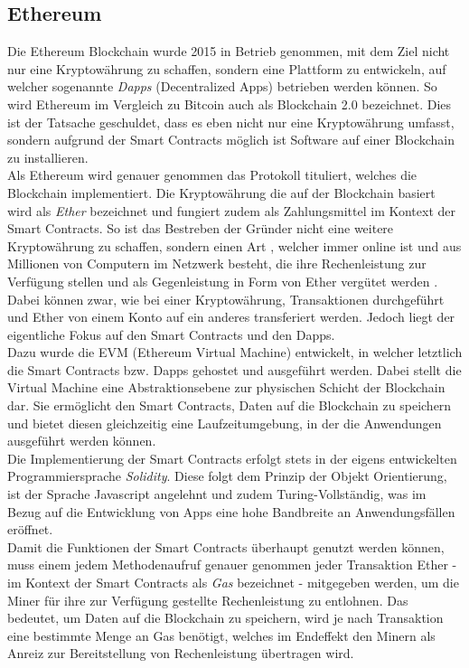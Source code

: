 \subsection{Ethereum}
Die Ethereum Blockchain wurde 2015 in Betrieb genommen, mit dem Ziel nicht nur eine Kryptowährung zu schaffen, sondern eine Plattform zu entwickeln, auf welcher sogenannte \textit{Dapps} (Decentralized Apps) betrieben werden können.
So wird Ethereum im Vergleich zu Bitcoin auch als Blockchain 2.0 bezeichnet. Dies ist der Tatsache geschuldet, dass es eben nicht nur eine Kryptowährung umfasst, sondern aufgrund der Smart Contracts möglich ist Software auf einer Blockchain zu installieren. \\
Als Ethereum wird genauer genommen das Protokoll tituliert, welches die Blockchain implementiert. Die Kryptowährung die auf der Blockchain basiert wird als \textit{Ether} bezeichnet und fungiert zudem als Zahlungsmittel im Kontext der Smart Contracts. So ist das Bestreben der Gründer nicht eine weitere Kryptowährung zu schaffen, sondern einen Art , welcher immer online ist und aus Millionen von Computern im Netzwerk besteht, die ihre Rechenleistung zur Verfügung stellen und als Gegenleistung in Form von Ether vergütet werden \cite{BitcoinEthNCo}. \\
Dabei können zwar, wie bei einer Kryptowährung, Transaktionen durchgeführt und Ether von einem Konto auf ein anderes transferiert werden. Jedoch liegt der eigentliche Fokus auf den Smart Contracts und den Dapps.\\
Dazu wurde die EVM (Ethereum Virtual Machine) entwickelt, in welcher letztlich die Smart Contracts bzw. Dapps gehostet und ausgeführt werden. Dabei stellt die Virtual Machine eine Abstraktionsebene zur physischen Schicht der Blockchain dar. Sie ermöglicht den Smart Contracts, Daten auf die Blockchain zu speichern und bietet diesen gleichzeitig eine Laufzeitumgebung, in der die Anwendungen ausgeführt werden können.\\
Die Implementierung der Smart Contracts erfolgt stets in der eigens entwickelten Programmiersprache \textit{Solidity}. Diese folgt dem Prinzip der Objekt Orientierung, ist der Sprache Javascript angelehnt und zudem Turing-Vollständig, was im Bezug auf die Entwicklung von Apps eine hohe Bandbreite an Anwendungsfällen eröffnet. \\
Damit die Funktionen der Smart Contracts überhaupt genutzt werden können, muss einem jedem Methodenaufruf genauer genommen jeder Transaktion Ether - im Kontext der Smart Contracts als \textit{Gas} bezeichnet - mitgegeben werden, um die Miner für ihre zur Verfügung gestellte Rechenleistung zu entlohnen. Das bedeutet, um Daten auf die Blockchain zu speichern, wird je nach Transaktion eine bestimmte Menge an Gas benötigt, welches im Endeffekt den Minern als Anreiz zur Bereitstellung von Rechenleistung übertragen wird. \\
